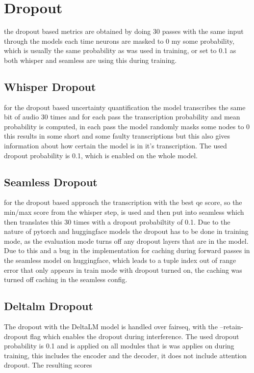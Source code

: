 \section{Dropout}\label{experiment:dropout}
the dropout based metrics are obtained by doing 30 passes with the same input through the models each time neurons are masked to 0 my some probability, which is usually the same probability as was used in training, or set to 0.1 as both whisper and seamless are using this during training. 

\subsection{Whisper Dropout}
for the dropout based uncertainty quantification the model transcribes the same bit of audio 30 times and for each pass the transcription probability and mean probability is computed, in each pass the model randomly masks some nodes to 0
this results in some short and some faulty transcriptions but this also gives information about how certain the model is in it's transcription. The used dropout probability is 0.1, which is enabled on the whole model.


\subsection{Seamless Dropout}
for the dropout based approach the transcription with the best qe score, so the min/max score from the whisper step, is used 
and then put into seamless which then translates this 30 times with a dropout probabiltity of 0.1.
Due to the nature of pytorch and huggingface models the dropout has to be done in training mode, as the evaluation mode turns off any dropout layers that are in the model. Due to this and a bug in the implementation for caching during forward passes in the seamless model on huggingface, which leads to a tuple index out of range error that only appears in train mode with dropout turned on, the caching was turned off caching in the seamless config. 

\subsection{Deltalm Dropout}
The dropout with the DeltaLM model is handled over fairseq, with the --retain-dropout flag which enables the dropout during interference.
The used dropout probability is 0.1 and is applied on all modules that is was applies on during training, this includes the encoder and the decoder, it does not include attention dropout. 
The resulting scores

